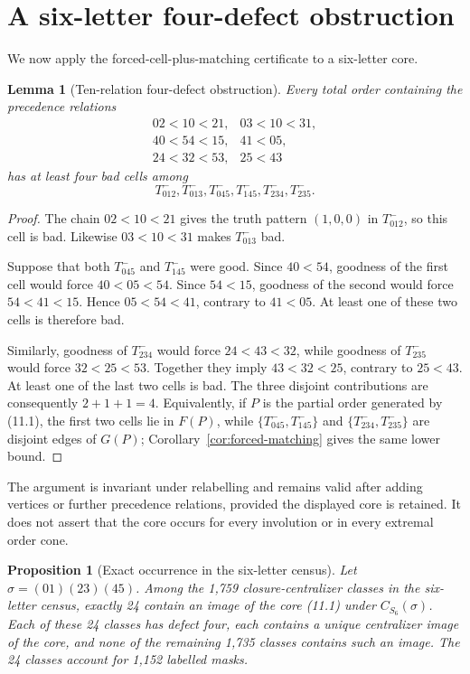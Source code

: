 \documentclass[11pt,a4paper]{article}
\newtheorem{proposition}[theorem]{Proposition}
\newtheorem{lemma}[theorem]{Lemma}
\theoremstyle{remark}
\begin{document}
\section{A six-letter four-defect obstruction}
\label{sec:obstruction}

We now apply the forced-cell-plus-matching certificate to a six-letter core.

\begin{lemma}[Ten-relation four-defect obstruction]
\label{lem:ten-relation-obstruction}
Every total order containing the precedence relations
\[
\begin{array}{lll}
02<10<21, & 03<10<31,\\
40<54<15, & 41<05,\\
24<32<53, & 25<43
\end{array}                                             \tag{11.1}
\]
has at least four bad cells among
\[
T^-_{012},T^-_{013},T^-_{045},T^-_{145},T^-_{234},T^-_{235}.
\]
\end{lemma}

\begin{proof}
The chain \(02<10<21\) gives the truth pattern \((1,0,0)\) in
\(T^-_{012}\), so this cell is bad.  Likewise \(03<10<31\) makes
\(T^-_{013}\) bad.

Suppose that both \(T^-_{045}\) and \(T^-_{145}\) were good.  Since
\(40<54\), goodness of the first cell would force \(40<05<54\).  Since
\(54<15\), goodness of the second would force \(54<41<15\).  Hence
\(05<54<41\), contrary to \(41<05\).  At least one of these two cells is
therefore bad.

Similarly, goodness of \(T^-_{234}\) would force \(24<43<32\), while
goodness of \(T^-_{235}\) would force \(32<25<53\).  Together they imply
\(43<32<25\), contrary to \(25<43\).  At least one of the last two cells is
bad.  The three disjoint contributions are consequently \(2+1+1=4\).
Equivalently, if \(P\) is the partial order generated by (11.1), the first
two cells lie in \(F(P)\), while
\(\{T^-_{045},T^-_{145}\}\) and
\(\{T^-_{234},T^-_{235}\}\) are disjoint edges of \(G(P)\);
Corollary~\ref{cor:forced-matching} gives the same lower bound.
\end{proof}

The argument is invariant under relabelling and remains valid after adding
vertices or further precedence relations, provided the displayed core is
retained.  It does not assert that the core occurs for every involution or in
every extremal order cone.

\begin{proposition}[Exact occurrence in the six-letter census]
\label{prop:obstruction-occurrence}
Let \(\sigma=(01)(23)(45)\).  Among the 1,759 closure-centralizer classes in
the six-letter census, exactly 24 contain an image of the core (11.1) under
\(C_{S_6}(\sigma)\).  Each of these 24 classes has defect four, each contains
a unique centralizer image of the core, and none of the remaining 1,735
classes contains such an image.  The 24 classes account for 1,152 labelled
masks.
\end{proposition}
\end{document}
